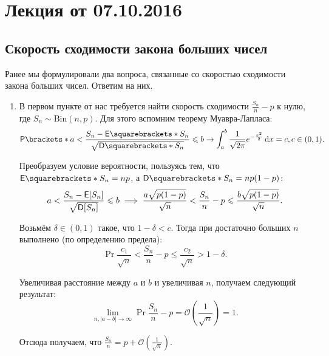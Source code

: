 \section{Лекция от 07.10.2016}

\subsection{Скорость сходимости закона больших чисел}
Ранее мы формулировали два вопроса, связанные со скоростью сходимости закона больших чисел. Ответим на них.

\begin{enumerate}
    \item В первом пункте от нас требуется найти скорость сходимости \(\frac{S_n}{n} - p\) к нулю, где \(S_n \sim \mathrm{Bin}(n, p)\). Для этого вспомним теорему Муавра-Лапласа:
    \[\Pr{a < \frac{S_n - \E{S_n}}{\sqrt{\D{S_n}}} \leq b} \to \int_{a}^{b} \frac{1}{\sqrt{2\pi}}e^{-\frac{x^2}{2}}\,\mathrm{d}x = c, c \in (0, 1).\]
    
    Преобразуем условие вероятности, пользуясь тем, что \(\E{S_n} = np\), а \(\D{S_n} = np(1 - p)\):
    \[a < \frac{S_n - \E[S_n]}{\sqrt{\D[S_n]}} \leq b \implies \frac{a\sqrt{p(1 - p)}}{\sqrt{n}} < \frac{S_n}{n} - p \leq \frac{b\sqrt{p(1 - p)}}{\sqrt{n}}.\]
    
    Возьмём \(\delta \in (0, 1)\) такое, что \(1 - \delta < c\). Тогда при достаточно больших \(n\) выполнено (по определению предела):
    \[\Pr{\frac{c_1}{\sqrt{n}} < \frac{S_n}{n} - p \leq \frac{c_2}{\sqrt{n}}} > 1 - \delta.\]
    
    Увеличивая расстояние между \(a\) и \(b\) и увеличивая \(n\), получаем следующий результат:
    \[\lim\limits_{n, |a - b| \to \infty} \Pr{\frac{S_n}{n} - p = \mathcal{O}\left(\frac{1}{\sqrt{n}}\right)} = 1.\]
    
    Отсюда получаем, что \(\frac{S_n}{n} = p + \mathcal{O}\left(\frac{1}{\sqrt{n}}\right)\).
    
    
    

\end{enumerate}
